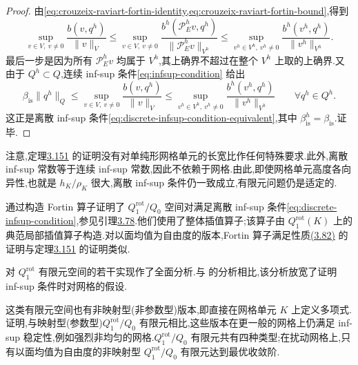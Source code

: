 \begin{proof}
由\cref{eq:crouzeix-raviart-fortin-identity,eq:crouzeix-raviart-fortin-bound},得到
\[
  \sup_{v\in V,\ v\ne0}
      \frac{b(v,q^h)}{\|v\|_V}
  \le
  \sup_{v\in V,\ v\ne0}
      \frac{b^h(\mathcal{P}_E^h v,q^h)}
           {\|\mathcal{P}_E^h v\|_{V^h}}
  \le
  \sup_{v^h\in V^h,\ v^h\ne0}
      \frac{b^h(v^h,q^h)}{\|v^h\|_{V^h}}.
\]
最后一步是因为所有 $\mathcal{P}_E^h v$ 均属于 $V^h$,其上确界不超过在整个 $V^h$ 上取的上确界.又由于 $Q^h\subset Q$,连续 inf-sup 条件\cref{eq:infsup-condition} 给出
\[
  \beta_{\mathrm{is}}\|q^h\|_Q
  \le
  \sup_{v\in V,\ v\ne0}\frac{b(v,q^h)}{\|v\|_V}
  \le
  \sup_{v^h\in V^h,\ v^h\ne0}
        \frac{b^h(v^h,q^h)}{\|v^h\|_{V^h}}
  \qquad\forall q^h\in Q^h.
\]
这正是离散 inf-sup 条件\cref{eq:discrete-infsup-condition-equivalent},其中 $\beta_{\mathrm{is}}^h=\beta_{\mathrm{is}}$.证毕.
\end{proof}

\begin{note}[各向异性网格单元]\label{note:crouzeix-raviart-anisotropic}
注意,定理\hyperref[thm:crouzeix-raviart-infsup]{3.151} 的证明没有对单纯形网格单元的长宽比作任何特殊要求.此外,离散 inf-sup 常数等于连续 inf-sup 常数,因此不依赖于网格.由此,即使网格单元高度各向异性,也就是 $h_K/\rho_K$ 很大,离散 inf-sup 条件仍一致成立,有限元问题仍是适定的.
\end{note}

\begin{note}\label{note:qrot-infsup}
\textcite{RannacherTurek1992} 通过构造 Fortin 算子证明了 $Q_1^{\mathrm{rot}}/Q_0$ 空间对满足离散 inf-sup 条件\cref{eq:discrete-infsup-condition},参见引理\hyperref[lem:fortin-criterion]{3.78}.他们使用了整体插值算子;该算子由 $Q_1^{\mathrm{rot}}(K)$ 上的典范局部插值算子构造.对以面均值为自由度的版本,Fortin 算子满足性质\hyperref[eq:fortin-property]{(3.82)} 的证明与定理\hyperref[thm:crouzeix-raviart-infsup]{3.151} 的证明类似.

\textcite{Schieweck1997} 对 $Q_1^{\mathrm{rot}}$ 有限元空间的若干实现作了全面分析.与\textcite{RannacherTurek1992} 的分析相比,该分析放宽了证明 inf-sup 条件时对网格的假设.
\end{note}

\begin{note}\label{note:unmapped-qrot}
这类有限元空间也有非映射型(非参数型)版本,即直接在网格单元 $K$ 上定义多项式.\textcite{RannacherTurek1992} 证明,与映射型(参数型)$Q_1^{\mathrm{rot}}/Q_0$ 有限元相比,这些版本在更一般的网格上仍满足 inf-sup 稳定性,例如强烈非均匀的网格.$Q_1^{\mathrm{rot}}/Q_0$ 有限元共有四种类型;在扰动网格上,只有以面均值为自由度的非映射型 $Q_1^{\mathrm{rot}}/Q_0$ 有限元达到最优收敛阶.
\end{note}

